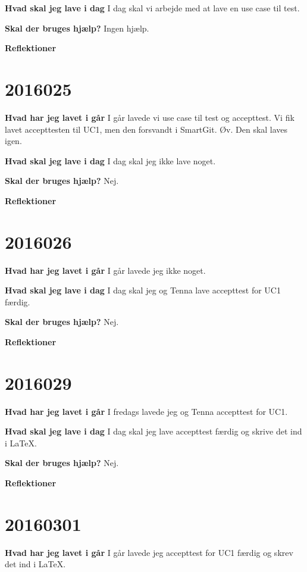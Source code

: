 \documentclass{article}
\begin{document}
	\textbf{Hvad skal jeg lave i dag}
	\subitem I dag skal vi arbejde med at lave en use case til test. 	 
	
	\textbf{Skal der bruges hjælp?}
	\subitem Ingen hjælp. 
	
	\textbf{Reflektioner}
	
	\section{2016025}
	
	\textbf{Hvad har jeg lavet i går}
	I går lavede vi use case til test og accepttest. Vi fik lavet accepttesten til UC1, men den forsvandt i SmartGit. Øv. Den skal laves igen. 
	
	\textbf{Hvad skal jeg lave i dag}
	I dag skal jeg ikke lave noget. 	
	
	\textbf{Skal der bruges hjælp?}
	Nej. 
	
	\textbf{Reflektioner}
	
	\section{2016026}
		
	\textbf{Hvad har jeg lavet i går}
	I går lavede jeg ikke noget. 
	
	\textbf{Hvad skal jeg lave i dag}
	I dag skal jeg og Tenna lave accepttest for UC1 færdig.  
	
	\textbf{Skal der bruges hjælp?}
	Nej. 
	
	\textbf{Reflektioner}
	
	\section{2016029}
		
	\textbf{Hvad har jeg lavet i går}
	I fredags lavede jeg og Tenna accepttest for UC1. 
		
	\textbf{Hvad skal jeg lave i dag}
	I dag skal jeg lave accepttest færdig og skrive det ind i LaTeX.  	
	
	\textbf{Skal der bruges hjælp?}
	Nej. 
		
	\textbf{Reflektioner}

	\section{20160301}
	
	\textbf{Hvad har jeg lavet i går}
	I går lavede jeg accepttest for UC1 færdig og skrev det ind i LaTeX. 
	
\end{document}
